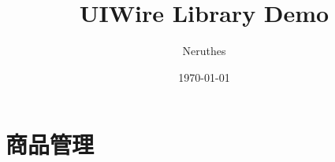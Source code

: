 \documentclass[a4paper,12pt]{report}
\title{UIWire Library Demo}
\author{Neruthes}
\date{\today}
\begin{document}
\maketitle\clearpage
\tableofcontents

\sffamily








\chapter{商品管理}\clearpage

\end{document}
